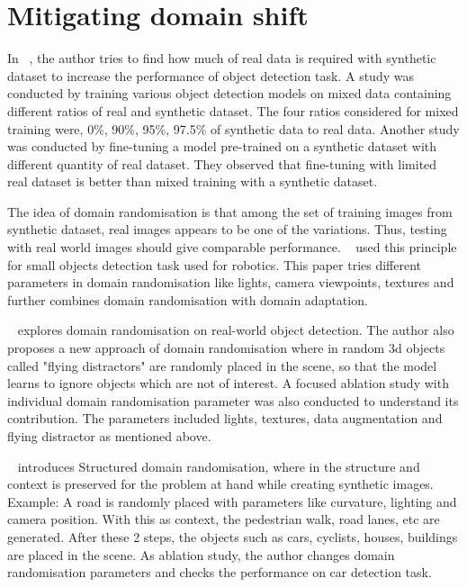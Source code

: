 \section{Mitigating domain shift}\label{sec:mitigating_domain_shift}


In ~\cite{nowruzi2019real}, the author tries to find how much of real data is required with synthetic dataset to increase the performance of object detection task.
A study was conducted by training various object detection models on mixed data containing different ratios of real and synthetic dataset.
The four ratios considered for mixed training were, 0\%, 90\%, 95\%, 97.5\% of synthetic data to real data.
Another study was conducted by fine-tuning a model pre-trained on a synthetic dataset with different quantity of real dataset.
They observed that fine-tuning with limited real dataset is better than mixed training with a synthetic dataset.

The idea of domain randomisation is that among the set of training images from synthetic dataset, real images appears to be one of the variations.
Thus, testing with real world images should give comparable performance.
~\cite{tobin2017domain} used this principle for small objects detection task used for robotics.
This paper tries different parameters in domain randomisation like lights, camera viewpoints, textures and further combines domain randomisation with domain adaptation.

~\cite{Tremblay2018TrainingDN} explores domain randomisation on real-world object detection.
The author also proposes a new approach of domain randomisation where in random 3d objects called "flying distractors" are randomly placed in the scene,
so that the model learns to ignore objects which are not of interest.
A focused ablation study with individual domain randomisation parameter was also conducted to understand its contribution.
The parameters included lights, textures, data augmentation and flying distractor as mentioned above.

~\cite{prakash2020structured} introduces Structured domain randomisation, where in the structure and context is preserved for the problem at hand while creating synthetic images.
Example: A road is randomly placed with parameters like curvature, lighting and camera position.
With this as context, the pedestrian walk, road lanes, etc are generated.
After these 2 steps, the objects such as cars, cyclists, houses, buildings are placed in the scene.
As ablation study, the author changes domain randomisation parameters and checks the performance on car detection task.

